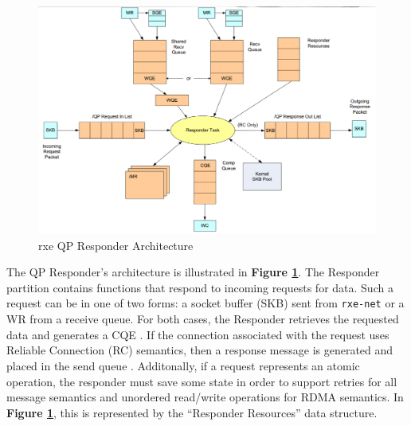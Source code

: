 \documentclass[11pt]{book}
\begin{document}
\begin{figure}[h]
\includegraphics[width=\textwidth]{rxe_resp}
\caption{rxe QP Responder Architecture \protect\cite{pearson-10}}
\label{rxe-resp}
\end{figure}

The QP Responder's architecture is illustrated in \textbf{Figure
  \ref{rxe-resp}}. The Responder partition contains functions that respond to
incoming requests for data. Such a request can be in one of two forms: a socket
buffer (SKB) sent from \verb;rxe-net; or a WR from a receive queue. For both
cases, the Responder retrieves the requested data and generates a CQE
\cite{pearson-10}. If the connection associated with the request uses Reliable
Connection (RC) semantics, then a response message is generated and placed in
the send queue \cite{InfiniBandTARoCE-10}\cite{pearson-10}. Additonally, if a
request represents an atomic operation, the responder must save some state in
order to support retries for all message semantics and unordered read/write
operations for RDMA semantics. In \textbf{Figure \ref{rxe-resp}}, this is
represented by the ``Responder Resources'' data structure.
\end{document}
